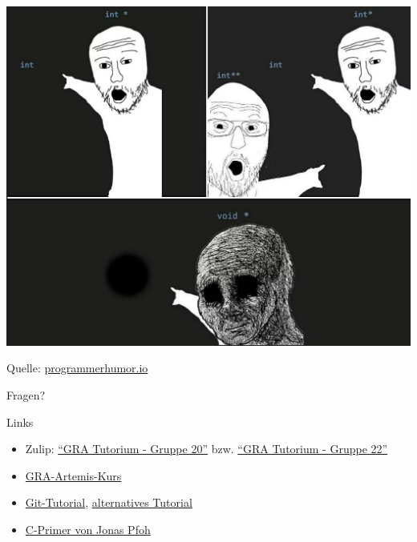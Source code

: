 \documentclass[
  german,            %
  aspectratio=169,    %
]{tumbeamer}
\begin{document}
\begin{frame}[c]{}{}
  \begin{center}
    \includegraphics[height=0.9\textheight]{w01_pointers_meme.png}
  \end{center}
  \centering
  \tiny{Quelle: \href{https://programmerhumor.io/backend-memes/how-to-c-pointers/}{programmerhumor.io}}
\end{frame}

\begin{frame}[c]{}{}
  \begin{center}
    \LARGE Fragen?
  \end{center}
\end{frame}

\begin{frame}[fragile, c]{Links}{}
  \begin{itemize}
    \item Zulip: \href{https://zulip.in.tum.de/#narrow/stream/2267-GRA-Tutorium---Gruppe-20}{\enquote{GRA Tutorium - Gruppe 20}}
          bzw. \href{https://zulip.in.tum.de/#narrow/stream/2269-GRA-Tutorium---Gruppe-22}{\enquote{GRA Tutorium - Gruppe 22}}
    \item \href{https://artemis.in.tum.de/courses/329}{GRA-Artemis-Kurs}
    \item \href{https://git-scm.com/docs/gittutorial}{Git-Tutorial}, \href{https://rogerdudler.github.io/git-guide/}{alternatives Tutorial}
    \item \href{https://www.sec.in.tum.de/i20/assets/vorlesung/c_primer.pdf}{C-Primer von Jonas Pfoh}
  \end{itemize}
\end{frame}

\maketitle
\end{document}
